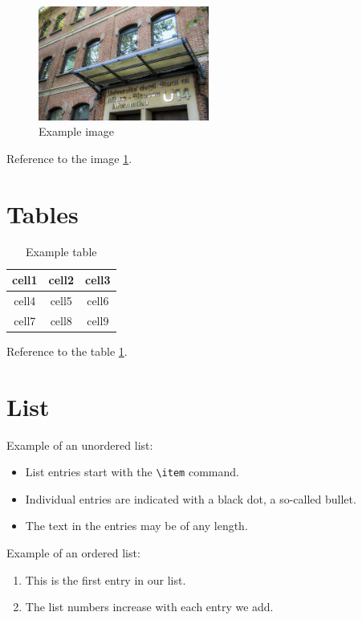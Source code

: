 \documentclass[a4paper, oneside]{book}
\begin{document}
\begin{figure}[H]
\centering
\includegraphics[width=0.5\textwidth]{u14.jpg}
\caption{Example image}
\label{img:ref_image}
\end{figure}

Reference to the image \ref{img:ref_image}.

\section{Tables}
\begin{table}
\centering
\begin{tabular}{|c|c|c|} 
 \hline
 cell1 & cell2 & cell3 \\ \hline
 cell4 & cell5 & cell6 \\ \hline
 cell7 & cell8 & cell9 \\ \hline
\end{tabular}
\caption{Example table}
\label{tab:ref_table}
\end{table}

Reference to the table \ref{tab:ref_table}.

\section{List}
Example of an unordered list:
\begin{itemize}
  \item List entries start with the \verb|\item| command.
  \item Individual entries are indicated with a black dot, a so-called bullet.
  \item The text in the entries may be of any length.
\end{itemize}

Example of an ordered list:
\begin{enumerate}
  \item This is the first entry in our list.
  \item The list numbers increase with each entry we add.
\end{enumerate}
\end{document}

